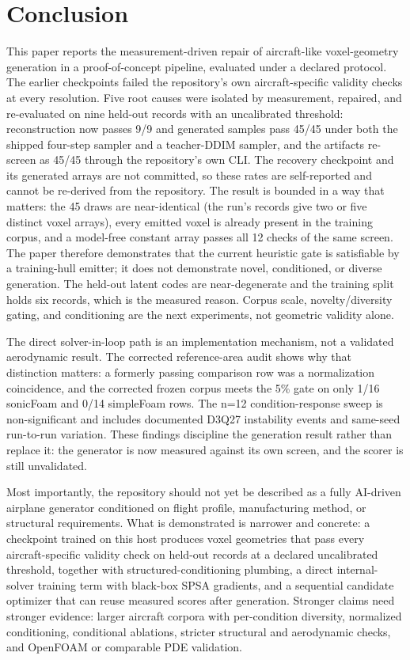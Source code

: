 \section{Conclusion}
\label{sec:conclusion}
This paper reports the measurement-driven repair of aircraft-like voxel-geometry generation in a proof-of-concept pipeline, evaluated under a declared protocol. The earlier checkpoints failed the repository's own aircraft-specific validity checks at every resolution. Five root causes were isolated by measurement, repaired, and re-evaluated on nine held-out records with an uncalibrated threshold: reconstruction now passes 9/9 and generated samples pass 45/45 under both the shipped four-step sampler and a teacher-DDIM sampler, and the artifacts re-screen as 45/45 through the repository's own CLI. The recovery checkpoint and its generated arrays are not committed, so these rates are self-reported and cannot be re-derived from the repository. The result is bounded in a way that matters: the 45 draws are near-identical (the run's records give two or five distinct voxel arrays), every emitted voxel is already present in the training corpus, and a model-free constant array passes all 12 checks of the same screen. The paper therefore demonstrates that the current heuristic gate is satisfiable by a training-hull emitter; it does not demonstrate novel, conditioned, or diverse generation. The held-out latent codes are near-degenerate and the training split holds six records, which is the measured reason. Corpus scale, novelty/diversity gating, and conditioning are the next experiments, not geometric validity alone.

The direct solver-in-loop path is an implementation mechanism, not a validated aerodynamic result. The corrected reference-area audit shows why that distinction matters: a formerly passing comparison row was a normalization coincidence, and the corrected frozen corpus meets the 5\% gate on only 1/16 sonicFoam and 0/14 simpleFoam rows. The n=12 condition-response sweep is non-significant and includes documented D3Q27 instability events and same-seed run-to-run variation. These findings discipline the generation result rather than replace it: the generator is now measured against its own screen, and the scorer is still unvalidated.

Most importantly, the repository should not yet be described as a fully AI-driven airplane generator conditioned on flight profile, manufacturing method, or structural requirements. What is demonstrated is narrower and concrete: a checkpoint trained on this host produces voxel geometries that pass every aircraft-specific validity check on held-out records at a declared uncalibrated threshold, together with structured-conditioning plumbing, a direct internal-solver training term with black-box SPSA gradients, and a sequential candidate optimizer that can reuse measured scores after generation. Stronger claims need stronger evidence: larger aircraft corpora with per-condition diversity, normalized conditioning, conditional ablations, stricter structural and aerodynamic checks, and OpenFOAM or comparable PDE validation.


